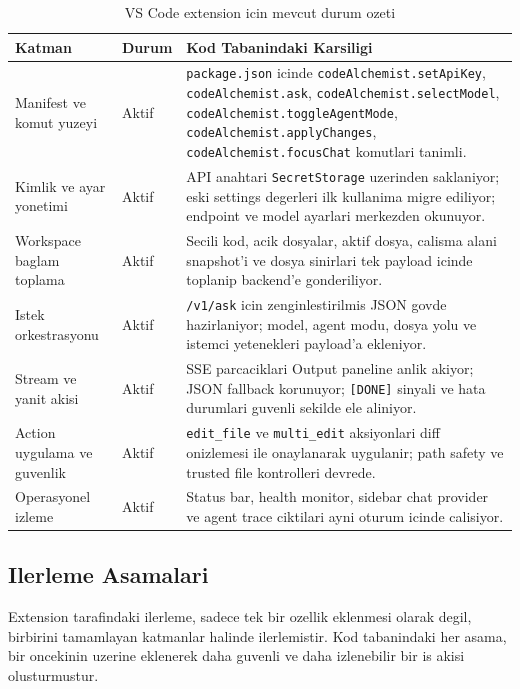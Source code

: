 \documentclass[11pt,a4paper]{article}
\begin{document}
\begin{table}[h]
\centering
\begin{tabularx}{\textwidth}{@{}l l X@{}}
\toprule
Katman & Durum & Kod Tabanindaki Karsiligi \\
\midrule
Manifest ve komut yuzeyi & Aktif & \texttt{package.json} icinde \texttt{codeAlchemist.setApiKey}, \texttt{codeAlchemist.ask}, \texttt{codeAlchemist.selectModel}, \texttt{codeAlchemist.toggleAgentMode}, \texttt{codeAlchemist.applyChanges}, \texttt{codeAlchemist.focusChat} komutlari tanimli. \\
Kimlik ve ayar yonetimi & Aktif & API anahtari \texttt{SecretStorage} uzerinden saklaniyor; eski settings degerleri ilk kullanima migre ediliyor; endpoint ve model ayarlari merkezden okunuyor. \\
Workspace baglam toplama & Aktif & Secili kod, acik dosyalar, aktif dosya, calisma alani snapshot'i ve dosya sinirlari tek payload icinde toplanip backend'e gonderiliyor. \\
Istek orkestrasyonu & Aktif & \texttt{/v1/ask} icin zenginlestirilmis JSON govde hazirlaniyor; model, agent modu, dosya yolu ve istemci yetenekleri payload'a ekleniyor. \\
Stream ve yanit akisi & Aktif & SSE parcaciklari Output paneline anlik akiyor; JSON fallback korunuyor; \texttt{[DONE]} sinyali ve hata durumlari guvenli sekilde ele aliniyor. \\
Action uygulama ve guvenlik & Aktif & \texttt{edit\_file} ve \texttt{multi\_edit} aksiyonlari diff onizlemesi ile onaylanarak uygulanir; path safety ve trusted file kontrolleri devrede. \\
Operasyonel izleme & Aktif & Status bar, health monitor, sidebar chat provider ve agent trace ciktilari ayni oturum icinde calisiyor. \\
\bottomrule
\end{tabularx}
\caption{VS Code extension icin mevcut durum ozeti}
\end{table}

\subsection{Ilerleme Asamalari}

Extension tarafindaki ilerleme, sadece tek bir ozellik eklenmesi olarak degil, birbirini tamamlayan katmanlar halinde ilerlemistir. Kod tabanindaki her asama, bir oncekinin uzerine eklenerek daha guvenli ve daha izlenebilir bir is akisi olusturmustur.
\end{document}
